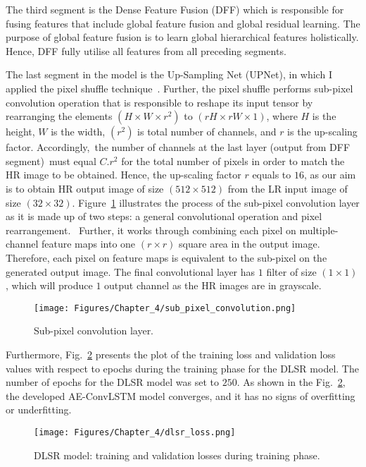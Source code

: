 The third segment is the Dense Feature Fusion (DFF) which is responsible for fusing features that include global feature fusion and global residual learning.
The purpose of global feature fusion is to learn global hierarchical features holistically.
Hence, DFF fully utilise all features from all preceding segments.

The last segment in the model is the Up-Sampling Net (UPNet), in which I applied the pixel shuffle technique~\cite{Shi2016}.
Further, the pixel shuffle performs sub-pixel convolution operation that is responsible to reshape its input tensor by rearranging the elements \((H\times W\times r^2)\) to \((rH\times rW\times 1)\), where \(H\) is the height, \(W\) is the width, \((r^2)\) is total number of channels, and \(r\) is the up-scaling factor.
Accordingly, the number of channels at the last layer (output from DFF segment) must equal \(C.r^2\) for the total number of pixels in order to match the HR image to be obtained.
Hence, the up-scaling factor \(r\) equals to \(16\), as our aim is to obtain HR output image of size \((512\times 512)\) from the LR input image of size \((32\times 32)\).
Figure~\ref{fig:sub_pixel_layer} illustrates the process of the sub-pixel convolution layer as it is made up of two steps: a general convolutional operation and pixel rearrangement. 
Further, it works through combining each pixel on multiple-channel feature maps into one \((r\times r)\) square area in the output image. 
Therefore, each pixel on feature maps is equivalent to the sub-pixel on the generated output image.
The final convolutional layer has \(1\) filter of size \((1\times 1)\), which will produce \(1\) output channel as the HR images are in grayscale. 
\begin{figure} [h!]
	\begin{center}
		\texttt{[image: Figures/Chapter\_4/sub\_pixel\_convolution.png]}
	\end{center}
	\caption{Sub-pixel convolution layer.} 
	\label{fig:sub_pixel_layer}
\end{figure}


Furthermore, Fig.~\ref{fig:dlsr_loss} presents the plot of the training loss and validation loss values with respect to epochs during the training phase for the DLSR model.
The number of epochs for the DLSR model was set to $250$.
As shown in the Fig.~\ref{fig:dlsr_loss}, the developed AE-ConvLSTM model converges, and it has no signs of overfitting or underfitting.
\begin{figure} [h!]
	\begin{center}
		\texttt{[image: Figures/Chapter\_4/dlsr\_loss.png]}
	\end{center}
	\caption{DLSR model: training and validation losses during training phase.} 
	\label{fig:dlsr_loss}
\end{figure}
